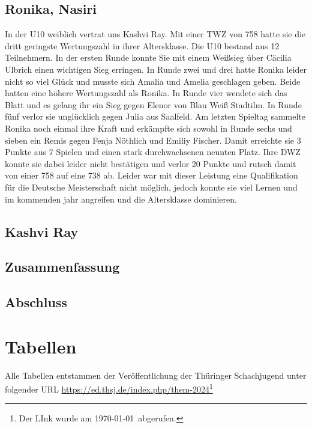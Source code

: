 \documentclass[a4paper,ngerman]{tui-algo-seminar}
\begin{document}
\subsection{Ronika, Nasiri}
In der U10 weiblich vertrat uns Kashvi Ray. Mit einer TWZ von 758 hatte sie die dritt geringste Wertungszahl in ihrer Altersklasse. Die U10 bestand aus 12 Teilnehmern.  In der ersten Runde konnte Sie mit einem Weißsieg über Cäcilia Ulbrich einen wichtigen Sieg erringen. In Runde zwei und drei hatte Ronika leider nicht so viel Glück und musste sich Amalia und Amelia geschlagen geben. Beide hatten eine höhere Wertungszahl als Ronika. In Runde vier wendete sich das Blatt und es gelang ihr ein Sieg gegen Elenor von Blau Weiß Stadtilm. In Runde fünf verlor sie unglücklich gegen Julia aus Saalfeld. Am letzten Spieltag sammelte Ronika noch einmal ihre Kraft und erkämpfte sich sowohl in Runde sechs und sieben ein Remis gegen Fenja Nöthlich und Emiliy Fischer. Damit erreichte sie 3 Punkte aus 7 Spielen und einen stark durchwachsenen neunten Platz. Ihre DWZ konnte sie dabei leider nicht bestätigen und verlor 20 Punkte und rutsch damit von einer 758 auf eine 738 ab. Leider war mit dieser Leistung eine Qualifikation für die Deutsche Meisterschaft nicht möglich, jedoch konnte sie viel Lernen und im kommenden jahr angreifen und die Altersklasse dominieren.


\subsection{Kashvi Ray}


\subsection{Zusammenfassung}


\subsection{Abschluss}


\clearpage
\section{Tabellen}
Alle Tabellen entstammen der Veröffentlichung der Thüringer Schachjugend unter folgender URL \url{https://ed.thsj.de/index.php/them-2024}\footnote{Der LInk wurde am \today ~abgerufen.}

\end{document}
